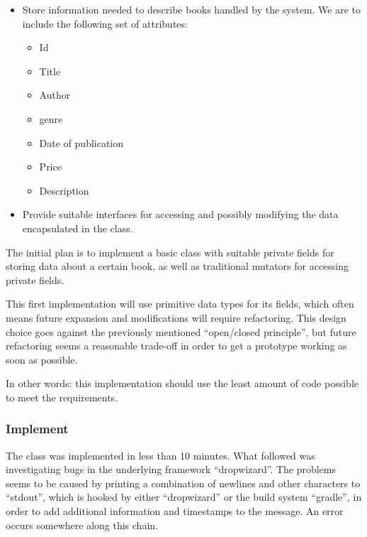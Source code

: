 \begin{itemize}
  \item Store information needed to describe books handled by the system.
        We are to include the following set of attributes:

  \begin{itemize}
    \item Id
    \item Title
    \item Author
    \item genre
    \item Date of publication
    \item Price
    \item Description
  \end{itemize}

  \item Provide suitable interfaces for accessing and possibly modifying the
        data encapsulated in the class.
\end{itemize}

The initial plan is to implement a basic class with suitable private fields for
storing data about a certain book, as well as traditional mutators for
accessing private fields.

This first implementation will use primitive data types for its fields, which
often means future expansion and modifications will require refactoring.
This design choice goes against the previously mentioned ``open/closed
principle'', but future refactoring seems a reasonable trade-off in order to get
a prototype working as soon as possible.


In other words: this implementation should use the least amount of code
possible to meet the requirements.


\subsubsection{Implement}\label{task-1a-implement}
The class was implemented in less than 10 minutes. What followed was
investigating bugs in the underlying framework
``dropwizard''\cite{framework:dropwizard}.
The problems seems to be caused by printing a combination of newlines and other
characters to ``stdout'', which is hooked by either ``dropwizard'' or the build
system ``gradle''\cite{tool:gradle}, in order to add additional information and
timestamps to the message.  An error occurs somewhere along this chain.


